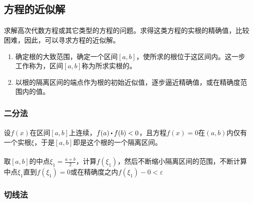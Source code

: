 \subsection{方程的近似解}
\paragraph{}
求解高次代数方程或其它类型的方程的问题。求得这类方程的实根的精确值，比较困难，因此，可以寻求方程的近似解。

\begin{enumerate}
  \item 确定根的大致范围，确定一个区间$[a,b]$，使所求的根位于这区间内。这一步工作称为，区间$[a,b]$称为所求实根的。
  \item 以根的隔离区间的端点作为根的初始近似值，逐步逼近精确值，或在精确度范围内的值。
\end{enumerate}

\subsubsection{二分法}
\paragraph{}
设$f(x)$在区间$[a,b]$上连续，$f(a)\bigcdot f(b) < 0$，且方程$f(x)=0$在$(a,b)$内仅有一个实根$\xi$，于是$[a,b]$即是这个根的一个隔离区间。

\paragraph{}
取$[a,b]$的中点$\displaystyle \xi_1 = \frac{a+b}{2}$，计算$f(\xi_1)$，然后不断缩小隔离区间的范围，不断计算中点$\xi_1$直到$f(\xi_1)=0$或在精确度之内$f(\xi_1) - 0 < \varepsilon$

\subsubsection{切线法}
